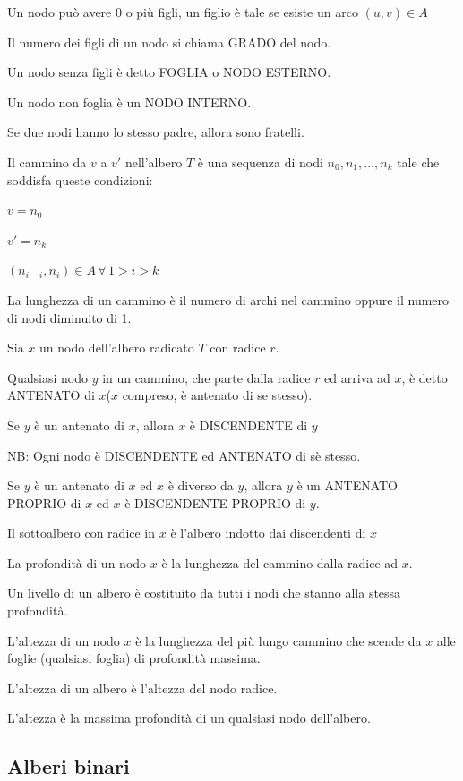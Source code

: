 \documentclass[tikz]{article}
\begin{document}
{{

{Un nodo può avere $0$ o più figli, un figlio è tale se esiste un arco $(u,v) \in A$}

{Il numero dei figli di un nodo si chiama GRADO del nodo.}

{Un nodo senza figli è detto FOGLIA o NODO ESTERNO.}

{Un nodo non foglia è un NODO INTERNO.}

{Se due nodi hanno lo stesso padre, allora sono fratelli.}

{Il cammino da $v$ a $v'$ nell'albero $T$ è una sequenza di nodi $n_0,n_1,\ldots,n_k$ tale che soddisfa queste condizioni:}

$v=n_0$

$v'=n_k$

$(n_{i-i},n_i) \in A\,\forall\,1>i>k$

{La lunghezza di un cammino è il numero di archi nel cammino oppure il numero di nodi diminuito di 1.}

{Sia $x$ un nodo dell'albero radicato $T$ con radice $r$.}

{Qualsiasi nodo $y$ in un cammino, che parte dalla radice $r$ ed arriva ad $x$, è detto ANTENATO di $x$($x$ compreso, è antenato di se stesso).}

{Se $y$ è un antenato di $x$, allora $x$ è DISCENDENTE di $y$}

{NB: Ogni nodo è DISCENDENTE ed ANTENATO di sè stesso.}

{Se $y$ è un antenato di $x$ ed $x$ è diverso da $y$, allora $y$ è un ANTENATO PROPRIO di $x$ ed $x$ è DISCENDENTE PROPRIO di $y$.}

{Il sottoalbero con radice in $x$ è l'albero indotto dai discendenti di $x$}

{La profondità di un nodo $x$ è la lunghezza del cammino dalla radice ad $x$.}

{Un livello di un albero è costituito da tutti i nodi che stanno alla stessa profondità. }

{L'altezza di un nodo $x$ è la lunghezza del più lungo cammino che scende da $x$ alle foglie (qualsiasi foglia) di profondità massima.}

{L'altezza di un albero è l'altezza del nodo radice.}

{L'altezza è la massima profondità di un qualsiasi nodo dell'albero.}

\subsection{Alberi binari}

}}
\end{document}
